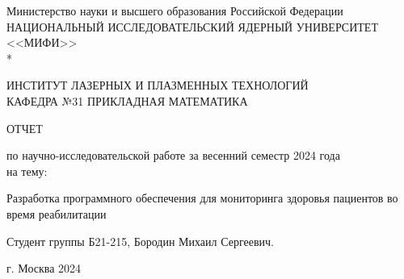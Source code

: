 
\begin{titlepage}
    \begin{center}
        Министерство науки и высшего образования Российской Федерации \\
        НАЦИОНАЛЬНЫЙ ИССЛЕДОВАТЕЛЬСКИЙ ЯДЕРНЫЙ УНИВЕРСИТЕТ <<МИФИ>> \\*
        \hrulefill
    \end{center}

    \begin{center}
        ИНСТИТУТ ЛАЗЕРНЫХ И ПЛАЗМЕННЫХ ТЕХНОЛОГИЙ\\
        КАФЕДРА №31 ПРИКЛАДНАЯ МАТЕМАТИКА
    \end{center}
    \vspace{1cm}

    \vspace{2em}

    \begin{center}
        \large{ОТЧЕТ}

        по научно-исследовательской работе
        за весенний семестр 2024 года \\

        на тему:
    \end{center}

    \begin{center}
        \large Разработка программного обеспечения для мониторинга здоровья пациентов во время реабилитации

    \end{center}

    \begin{center}
        \large Студент группы Б21-215, Бородин Михаил Сергеевич.
    \end{center}



    \vspace{25em}

    \begin{center}
        г. Москва 2024
    \end{center}
\end{titlepage}
